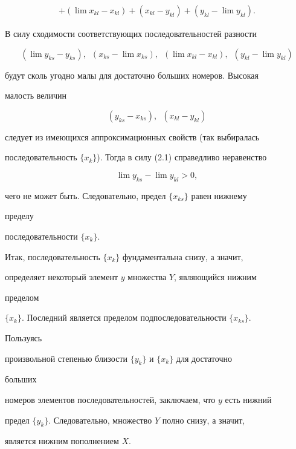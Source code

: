 \begin{pf}
\begin{multline*}
% 


+(\lim x_{kl}-x_{kl})+(x_{kl}-y_{kl})+ 


(y_{kl}-\lim y_{kl}). 


\end{multline*} 


В силу сходимости соответствующих последовательностей разности 


$$ 


(\lim y_{ks}-y_{ks}),\ \; (x_{ks}-\lim x_{ks}), 


\ \; (\lim x_{kl}-x_{kl}),\ \; (y_{kl}-\lim y_{kl}) 


$$ 


будут сколь угодно малы для достаточно больших номеров. Высокая 


малость величин 


$$ 


(y_{ks}-x_{ks}),\ \; (x_{kl}-y_{kl}) 


$$ 


следует из имеющихся аппроксимационных свойств (так выбиралась 


последовательность $\{x_k\}$). Тогда в силу (2.1) справедливо неравенство 


$$ 


\lim y_{ks}-\lim y_{kl}>0, 


$$ 


чего не может быть. Следовательно, предел $\{x_{ks}\}$ равен нижнему 


пределу 


последовательности $\{x_k\}$. 


 


Итак, последовательность $\{x_k\}$ фундаментальна снизу, а значит, 


определяет некоторый элемент $y$ множества $Y$, являющийся нижним 


пределом 


$\{x_k\}$. Последний является пределом подпоследовательности $\{x_{ks}\}$. 


Пользуясь 


произвольной степенью близости $\{y_k\}$ и $\{x_k\}$ для достаточно 


больших 


номеров элементов последовательностей, заключаем, что $y$ есть нижний 


предел $\{y_k\}$. Следовательно, множество $Y$ полно снизу, а значит, 


является нижним пополнением $X$. 


\end{pf} 


